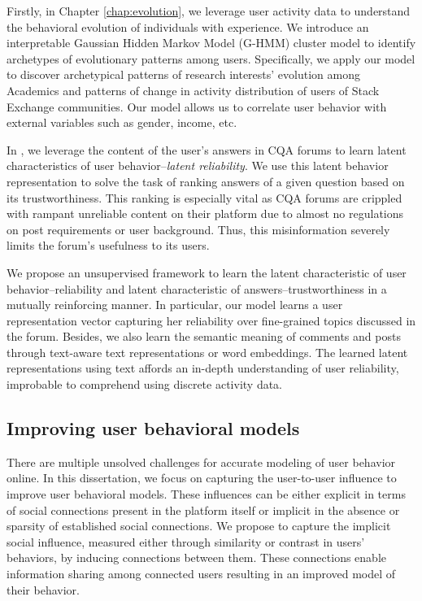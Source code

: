 Firstly, in Chapter \ref{chap:evolution}, we leverage user activity data to understand the behavioral evolution of individuals with experience.
We introduce an interpretable Gaussian Hidden Markov Model (G-HMM) cluster model to identify archetypes of evolutionary patterns among users.
Specifically, we apply our model to discover archetypical patterns of research interests' evolution among Academics and patterns of change in activity distribution of users of Stack Exchange communities. Our model allows us to correlate user behavior with external variables such as gender, income, etc.

In , we leverage the content of the user's answers in CQA forums to learn latent characteristics of user behavior--\emph{latent reliability}. We use this latent behavior representation to solve the task of ranking answers of a given question based on its trustworthiness. This ranking is especially vital as CQA forums are crippled with rampant unreliable content on their platform due to almost no regulations on post requirements or user background. Thus, this misinformation severely limits the forum's usefulness to its users.

We propose an unsupervised framework to learn the latent characteristic of user behavior--reliability and latent characteristic of answers--trustworthiness in a mutually reinforcing manner.
In particular, our model learns a user representation vector capturing her reliability over fine-grained topics discussed in the forum. Besides, we also learn the semantic meaning of comments and posts through text-aware text representations or word embeddings.
The learned latent representations using text affords an in-depth understanding of user reliability, improbable to comprehend using discrete activity data.



\subsection{Improving user behavioral models}
There are multiple unsolved challenges for accurate modeling of user behavior online.
In this dissertation, we focus on capturing the user-to-user influence to improve user behavioral models.
These influences can be either explicit in terms of social connections present in the platform itself or implicit in the absence or sparsity of established social connections.
We propose to capture the implicit social influence, measured either through similarity or contrast in users' behaviors, by inducing connections between them. These connections enable information sharing among connected users resulting in an improved model of their behavior.

